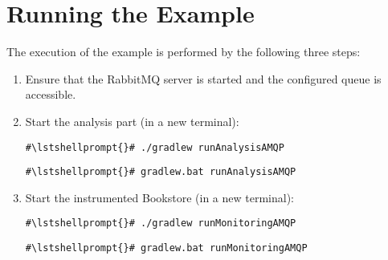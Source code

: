 \setPropertiesListing


\setPropertiesListing


\section{Running the Example}
The execution of the example is performed by the following three steps:
\begin{enumerate}
\item Ensure that the RabbitMQ server is started and the configured queue is accessible.

\item Start the analysis part (in a new terminal):
\setBashListing
\begin{lstlisting}[caption=Start the analysis part under UNIX-like systems]
#\lstshellprompt{}# ./gradlew runAnalysisAMQP
\end{lstlisting}
\begin{lstlisting}[caption=Start the analysis part under Windows]
#\lstshellprompt{}# gradlew.bat runAnalysisAMQP
\end{lstlisting}
\item Start the instrumented Bookstore (in a new terminal):
\setBashListing
\begin{lstlisting}[caption=Start the analysis part under UNIX-like systems]
#\lstshellprompt{}# ./gradlew runMonitoringAMQP
\end{lstlisting}
\begin{lstlisting}[caption=Start the analysis part under Windows]
#\lstshellprompt{}# gradlew.bat runMonitoringAMQP
\end{lstlisting}
\end{enumerate}